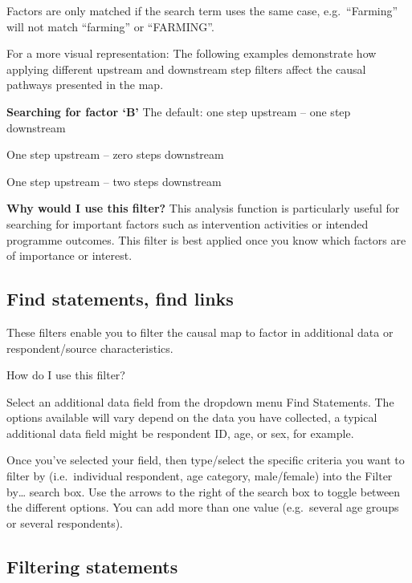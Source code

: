 \documentclass[
]{book}
\begin{document}
Factors are only matched if the search term uses the same case, e.g.~``Farming'' will not match ``farming'' or ``FARMING''.

For a more visual representation: The following examples demonstrate how applying different upstream and downstream step filters affect the causal pathways presented in the map.

\textbf{Searching for factor `B'} The default: one step upstream -- one step downstream

One step upstream -- zero steps downstream

One step upstream -- two steps downstream

\textbf{Why would I use this filter?} This analysis function is particularly useful for searching for important factors such as intervention activities or intended programme outcomes. This filter is best applied once you know which factors are of importance or interest.

\hypertarget{find-statements-find-links}{%
\subsection{Find statements, find links}\label{find-statements-find-links}}

These filters enable you to filter the causal map to factor in additional data or respondent/source characteristics.

How do I use this filter?

Select an additional data field from the dropdown menu Find Statements. The options available will vary depend on the data you have collected, a typical additional data field might be respondent ID, age, or sex, for example.

Once you've selected your field, then type/select the specific criteria you want to filter by (i.e.~individual respondent, age category, male/female) into the Filter by\ldots{} search box. Use the arrows to the right of the search box to toggle between the different options. You can add more than one value (e.g.~several age groups or several respondents).

\hypertarget{filtering-statements}{%
\subsection{Filtering statements}\label{filtering-statements}}
\end{document}
